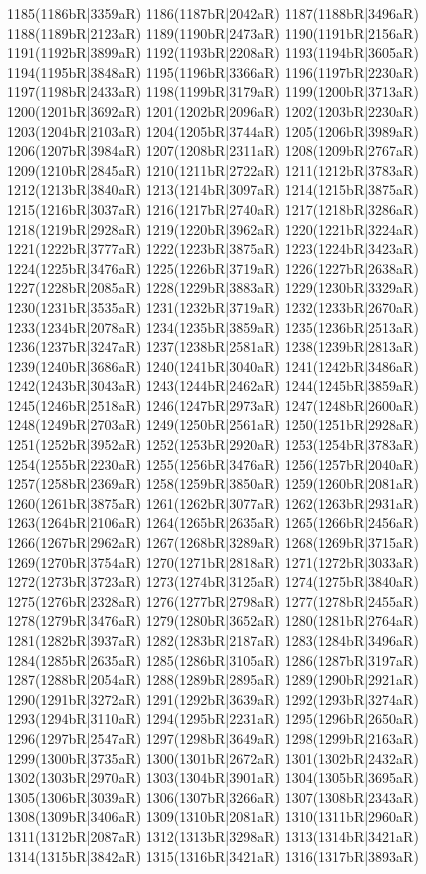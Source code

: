 1185(1186bR|3359aR) 1186(1187bR|2042aR) 1187(1188bR|3496aR) \\1188(1189bR|2123aR) 1189(1190bR|2473aR) 1190(1191bR|2156aR) 1191(1192bR|3899aR) 1192(1193bR|2208aR) 1193(1194bR|3605aR) 1194(1195bR|3848aR) 1195(1196bR|3366aR) 1196(1197bR|2230aR) \\1197(1198bR|2433aR) 1198(1199bR|3179aR) 1199(1200bR|3713aR) 1200(1201bR|3692aR) 1201(1202bR|2096aR) 1202(1203bR|2230aR) 1203(1204bR|2103aR) 1204(1205bR|3744aR) 1205(1206bR|3989aR) \\1206(1207bR|3984aR) 1207(1208bR|2311aR) 1208(1209bR|2767aR) 1209(1210bR|2845aR) 1210(1211bR|2722aR) 1211(1212bR|3783aR) 1212(1213bR|3840aR) 1213(1214bR|3097aR) 1214(1215bR|3875aR) \\1215(1216bR|3037aR) 1216(1217bR|2740aR) 1217(1218bR|3286aR) 1218(1219bR|2928aR) 1219(1220bR|3962aR) 1220(1221bR|3224aR) 1221(1222bR|3777aR) 1222(1223bR|3875aR) 1223(1224bR|3423aR) \\1224(1225bR|3476aR) 1225(1226bR|3719aR) 1226(1227bR|2638aR) 1227(1228bR|2085aR) 1228(1229bR|3883aR) 1229(1230bR|3329aR) 1230(1231bR|3535aR) 1231(1232bR|3719aR) 1232(1233bR|2670aR) \\1233(1234bR|2078aR) 1234(1235bR|3859aR) 1235(1236bR|2513aR) 1236(1237bR|3247aR) 1237(1238bR|2581aR) 1238(1239bR|2813aR) 1239(1240bR|3686aR) 1240(1241bR|3040aR) 1241(1242bR|3486aR) \\1242(1243bR|3043aR) 1243(1244bR|2462aR) 1244(1245bR|3859aR) 1245(1246bR|2518aR) 1246(1247bR|2973aR) 1247(1248bR|2600aR) 1248(1249bR|2703aR) 1249(1250bR|2561aR) 1250(1251bR|2928aR) \\1251(1252bR|3952aR) 1252(1253bR|2920aR) 1253(1254bR|3783aR) 1254(1255bR|2230aR) 1255(1256bR|3476aR) 1256(1257bR|2040aR) 1257(1258bR|2369aR) 1258(1259bR|3850aR) 1259(1260bR|2081aR) \\1260(1261bR|3875aR) 1261(1262bR|3077aR) 1262(1263bR|2931aR) 1263(1264bR|2106aR) 1264(1265bR|2635aR) 1265(1266bR|2456aR) 1266(1267bR|2962aR) 1267(1268bR|3289aR) 1268(1269bR|3715aR) \\1269(1270bR|3754aR) 1270(1271bR|2818aR) 1271(1272bR|3033aR) 1272(1273bR|3723aR) 1273(1274bR|3125aR) 1274(1275bR|3840aR) 1275(1276bR|2328aR) 1276(1277bR|2798aR) 1277(1278bR|2455aR) \\1278(1279bR|3476aR) 1279(1280bR|3652aR) 1280(1281bR|2764aR) 1281(1282bR|3937aR) 1282(1283bR|2187aR) 1283(1284bR|3496aR) 1284(1285bR|2635aR) 1285(1286bR|3105aR) 1286(1287bR|3197aR) \\1287(1288bR|2054aR) 1288(1289bR|2895aR) 1289(1290bR|2921aR) 1290(1291bR|3272aR) 1291(1292bR|3639aR) 1292(1293bR|3274aR) 1293(1294bR|3110aR) 1294(1295bR|2231aR) 1295(1296bR|2650aR) \\1296(1297bR|2547aR) 1297(1298bR|3649aR) 1298(1299bR|2163aR) 1299(1300bR|3735aR) 1300(1301bR|2672aR) 1301(1302bR|2432aR) 1302(1303bR|2970aR) 1303(1304bR|3901aR) 1304(1305bR|3695aR) \\1305(1306bR|3039aR) 1306(1307bR|3266aR) 1307(1308bR|2343aR) 1308(1309bR|3406aR) 1309(1310bR|2081aR) 1310(1311bR|2960aR) 1311(1312bR|2087aR) 1312(1313bR|3298aR) 1313(1314bR|3421aR) \\1314(1315bR|3842aR) 1315(1316bR|3421aR) 1316(1317bR|3893aR) 